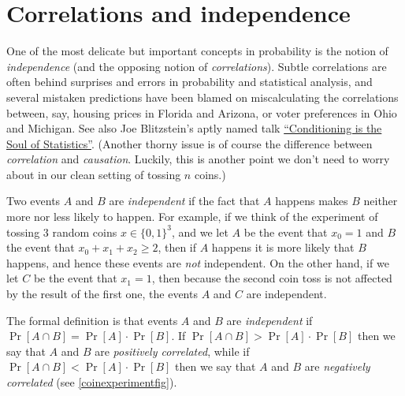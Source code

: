 \section{Correlations and
independence}\label{Correlations-and-independence}

One of the most delicate but important concepts in probability is the
notion of \emph{independence} (and the opposing notion of
\emph{correlations}). Subtle correlations are often behind surprises and
errors in probability and statistical analysis, and several mistaken
predictions have been blamed on miscalculating the correlations between,
say, housing prices in Florida and Arizona, or voter preferences in Ohio
and Michigan. See also Joe Blitzstein's aptly named talk
\href{https://youtu.be/dzFf3r1yph8}{``Conditioning is the Soul of
Statistics''}. (Another thorny issue is of course the difference between
\emph{correlation} and \emph{causation}. Luckily, this is another point
we don't need to worry about in our clean setting of tossing \(n\)
coins.)

Two events \(A\) and \(B\) are \emph{independent} if the fact that \(A\)
happens makes \(B\) neither more nor less likely to happen. For example,
if we think of the experiment of tossing \(3\) random coins
\(x\in \{0,1\}^3\), and we let \(A\) be the event that \(x_0=1\) and
\(B\) the event that \(x_0 + x_1 + x_2 \geq 2\), then if \(A\) happens
it is more likely that \(B\) happens, and hence these events are
\emph{not} independent. On the other hand, if we let \(C\) be the event
that \(x_1=1\), then because the second coin toss is not affected by the
result of the first one, the events \(A\) and \(C\) are independent.

The formal definition is that events \(A\) and \(B\) are
\emph{independent} if \(\Pr[A \cap B]=\Pr[A] \cdot \Pr[B]\). If
\(\Pr[A \cap B] > \Pr[A]\cdot \Pr[B]\) then we say that \(A\) and \(B\)
are \emph{positively correlated}, while if
\(\Pr[ A \cap B] < \Pr[A] \cdot \Pr[B]\) then we say that \(A\) and
\(B\) are \emph{negatively correlated} (see \cref{coinexperimentfig}).


